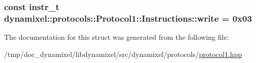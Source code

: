 \subsubsection[{write}]{\setlength{\rightskip}{0pt plus 5cm}const {\bf instr\+\_\+t} dynamixel\+::protocols\+::\+Protocol1\+::\+Instructions\+::write = 0x03\hspace{0.3cm}{\ttfamily [static]}}\label{structdynamixel_1_1protocols_1_1_protocol1_1_1_instructions_ac41fa9bb55c7a922e39d12b120cd9e51}


The documentation for this struct was generated from the following file\+:\begin{DoxyCompactItemize}
\item 
/tmp/doc\+\_\+dynamixel/libdynamixel/src/dynamixel/protocols/\hyperlink{protocol1_8hpp}{protocol1.\+hpp}\end{DoxyCompactItemize}
